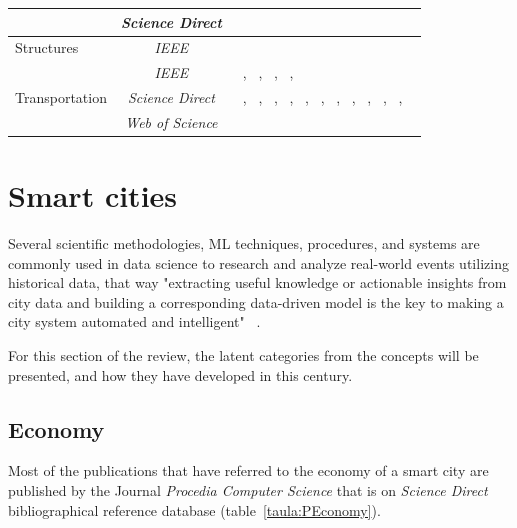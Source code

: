 \documentclass[a4paper,12pt,twoside]{ThesisStyle}
\begin{document}
\begin{longtable}{  l c l  }
\cline{2-3} 
 &\multirow{1}{*}{\textit{Science Direct}}  & ~\cite{embarak2021new} \\
\hline
\multirow{1}{*}{Structures}  & \textit{IEEE} &  ~\cite{Zinno2022bridges} \\
\hline
\multirow{6}{*}{Transportation} & \textit{IEEE} & \parbox{7cm}{~\cite{Zhao2017passenger}, ~\cite{Wang2017Taxis}, ~\cite{Bawaneh2019traffic}, ~\cite{Xu2019outlier}, ~\cite{Nugraha2021rail} } \\
 & \textit{Science Direct} & \parbox{7cm}{~\cite{masino2017learning}, ~\cite{killeen2019iot}, ~\cite{belhadi2020space}, ~\cite{mondal2020road}, ~\cite{gomari2021cluster}, ~\cite{kyriakou2021vehicles}, ~\cite{Wang2021CAN}, ~\cite{bachechi2022big}, ~\cite{sara2020predict}, ~\cite{karanfilovska2022analysis}, ~\cite{vidovic2022methodology}, ~\cite{wu2023gtfs} } \\
 & \textit{Web of Science} &  ~\cite{zantalis2019review} \\
\end{longtable} 

\section{Smart cities}
\label{subcap:smartcities}

Several scientific methodologies, ML techniques, procedures, and systems are commonly used in data science to research and analyze real-world events utilizing historical data, that way "extracting useful knowledge or actionable insights from city data and building a corresponding data-driven model is the key to making a city system automated and intelligent" ~\cite{SmartCitiesDataScience2022}. 

For this section of the review, the latent categories from the concepts will be presented, and how they have developed in this century.

\subsection{Economy}

Most of the publications that have referred to the economy of a smart city are published by the Journal \textit{Procedia Computer Science} that is on \textit{Science Direct} bibliographical reference database (table~\ref{taula:PEconomy}). 
\end{document}
